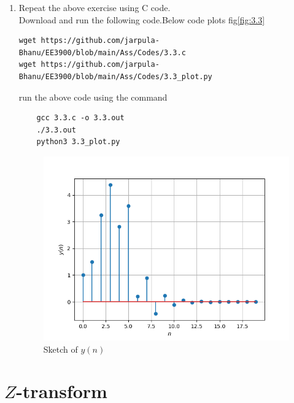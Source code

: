 \documentclass[journal,12pt,twocolumn]{IEEEtran}
\renewcommand\thesection{\arabic{section}}
\begin{document}
\begin{enumerate}[label=\thesection.\arabic*
,ref=\thesection.\theenumi]
\item Repeat the above exercise using C code.\\
\solution Download and run the following code.Below code plots fig\eqref{fig:3.3}
\begin{lstlisting}
wget https://github.com/jarpula-Bhanu/EE3900/blob/main/Ass/Codes/3.3.c
wget https://github.com/jarpula-Bhanu/EE3900/blob/main/Ass/Codes/3.3_plot.py
\end{lstlisting}
run the above code using the command
\begin{lstlisting}
	gcc 3.3.c -o 3.3.out
	./3.3.out
	python3 3.3_plot.py
\end{lstlisting}
\begin{figure}[h]
    \centering
    \includegraphics[width=\columnwidth]{./figs/3.3_plot.png}
    \caption{Sketch of $y(n)$}
    \label{fig:3.3}
\end{figure}


\end{enumerate}

\section{$Z$-transform}
\end{document}
